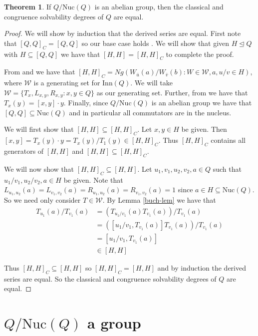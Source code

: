 \documentclass[12pt]{report}
\theoremstyle{definition}
\newtheorem{thm}{Theorem}[chapter]
\newcommand{\rdv}{/}                %
\newcommand{\nuc}{\text{Nuc}}       %
\newcommand{\inn}{\text{Inn}}       %
\begin{document}
\begin{thm}
  If $Q/\nuc(Q)$ is an abelian group, then the classical and congruence solvability degrees of $Q$ are equal.
\end{thm}

\begin{proof}
  We will show by induction that the derived series are equal. First note that $[Q, Q]_C = [Q, Q]$
    so our base case holds \cite{ComTheory}. We will show that given $H\unlhd Q$ with
    $H\subseteq [Q, Q]$ we have that $[H, H] = [H, H]_C$ to complete the proof.

  From \cite{ComTheory} and \cite{BK-inner} we have that
    $[H, H]_C = Ng(W_{\bar{u}}(a)/W_{\bar{v}}(b) : W\in\mathcal{W}, a, u/v\in H)$, where
    $\mathcal{W}$ is a generating set for $\inn(Q)$. We will take
    $\mathcal{W} = \{T_x, L_{x, y}, R_{x, y} : x, y\in Q\}$ as our generating set. Further,
    from \cite{PACC} we have that $T_x(y) = [x, y]\cdot y$. Finally, since $Q\rdv\nuc(Q)$ is
    an abelian group we have that $[Q, Q]\subseteq \nuc(Q)$ and in particular all
    commutators are in the nucleus.

  We will first show that $[H, H]\subseteq [H, H]_C$. Let $x, y\in H$ be given. Then
    $[x, y] = T_x(y)\cdot y = T_x(y)\rdv T_1(y) \in [H, H]_C$. Thus $[H, H]_C$ contains
    all generators of $[H, H]$ and $[H, H]\subseteq [H, H]_C$.

  We will now show that $[H, H]_C\subseteq [H, H]$. Let $u_1, v_1, u_2, v_2, a\in Q$
    such that $u_1\rdv v_1, u_2\rdv v_2, a\in H$ be given. Note that
    $L_{u_1, u_2}(a) = L_{v_1, v_2}(a) = R_{u_1, u_2}(a) = R_{v_1, v_2}(a) = 1$ since
    $a\in H\subseteq \nuc(Q)$. So we need only consider $T\in\mathcal{W}$. By Lemma
    \ref{buch-lem} we have that
  \begin{align*}
    T_{u_1}(a)\rdv T_{v_1}(a) &= (T_{u_1\rdv v_1}(a) T_{v_1}(a))\rdv T_{v_1}(a)\\
    &= ([u_1\rdv v_1, T_{v_1}(a)] T_{v_1}(a))\rdv T_{v_1}(a)\\
    &= [u_1\rdv v_1, T_{v_1}(a)]\\
    &\in [H, H]
  \end{align*}
  
  Thus $[H, H]_C\subseteq [H, H]$ so $[H, H]_C = [H, H]$ and by induction the derived series
    are equal. So the classical and congruence solvability degrees of $Q$ are equal.
\end{proof}

\section{$Q/\nuc(Q)$ a group}
\label{sec:innMappings}
\end{document}
